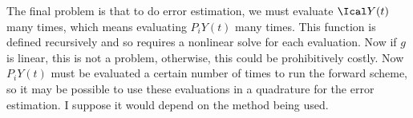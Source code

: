 \documentclass{amsart}
\begin{document}
	The final problem is that to do error estimation, we must evaluate $\Ical Y(t)$ many times, which means evaluating  $P_iY(t)$  many times.  This function is defined recursively and so requires a nonlinear solve for each evaluation.  Now if $g$ is linear, this is not a problem, otherwise, this could be prohibitively costly.  Now $P_iY(t)$ must be evaluated a certain number of times to run the forward scheme, so it may be possible to use these evaluations in a quadrature for the error estimation.  I suppose it would depend on the method being used.



















 
\end{document}
